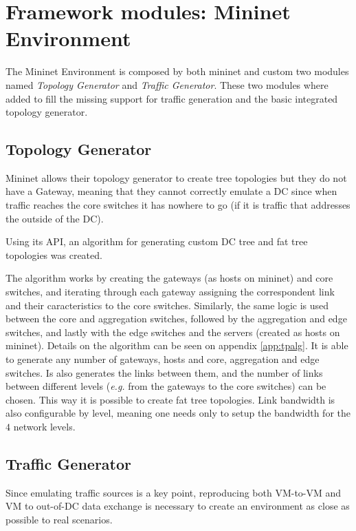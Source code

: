 \documentclass[12pt,english,oneside]{book}
\begin{document}
\section{Framework modules: Mininet Environment}
\hspace{0.6cm}

The Mininet Environment is composed by both mininet and custom two modules named \textit{Topology Generator} and \textit{Traffic Generator}.
These two modules where added to fill the missing support for traffic generation and the basic integrated topology generator.

\subsection{Topology Generator}
\hspace{0.6cm}

Mininet allows their topology generator to create tree topologies but they do not have a Gateway, meaning that they cannot correctly emulate a DC since when traffic reaches the core switches it has nowhere to go (if it is traffic that addresses the outside of the DC).

Using its API, an algorithm for generating custom DC tree and fat tree topologies was created.

The algorithm works by creating the gateways (as hosts on mininet) and core switches, and iterating through each gateway assigning the correspondent link and their caracteristics to the core switches. Similarly, the same logic is used between the core and aggregation switches, followed by the aggregation and edge switches, and lastly with the edge switches and the servers (created as hosts on mininet).
Details on the algorithm can be seen on appendix \ref{app:tpalg}.
It is able to generate any number of gateways, hosts and core, aggregation and edge switches.
Is also generates the links between them, and the number of links between different levels (\textit{e.g.} from the gateways to the core switches) can be chosen. This way it is possible to create fat tree topologies.
Link bandwidth is also configurable by level, meaning one needs only to setup the bandwidth for the $4$ network levels.

\subsection{Traffic Generator}
\hspace{0.6cm}

Since emulating traffic sources is a key point, reproducing both VM-to-VM and VM to out-of-DC data exchange is necessary to create an environment as close as possible to real scenarios.
\end{document}
